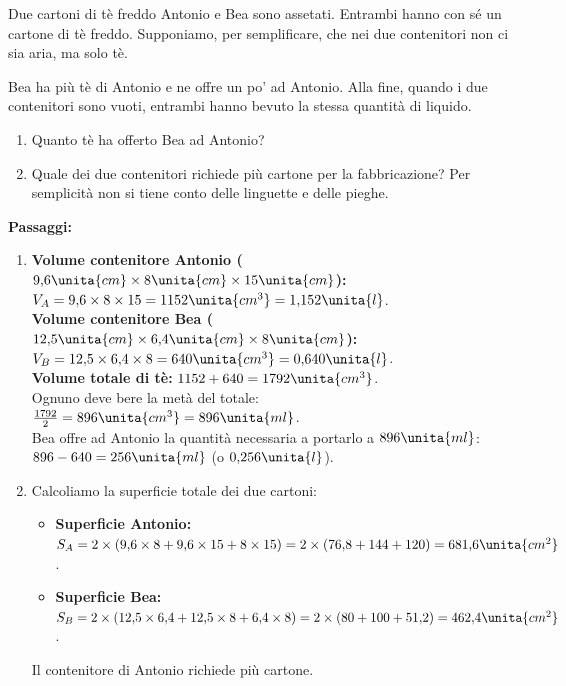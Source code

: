 \begin{esercizio}{Due cartoni di tè freddo}
Antonio e Bea sono assetati. Entrambi hanno con sé un cartone di tè freddo. Supponiamo, per semplificare, che nei due contenitori non ci sia aria, ma solo tè.

Bea ha più tè di Antonio e ne offre un po' ad Antonio. Alla fine, quando i due contenitori sono vuoti, entrambi hanno bevuto la stessa quantità di liquido.


\begin{enumerate}[label=\alph*)]
  \item Quanto tè ha offerto Bea ad Antonio?
  \item Quale dei due contenitori richiede più cartone per la fabbricazione? Per semplicità non si tiene conto delle linguette e delle pieghe.
\end{enumerate}

\responsespace{2.8cm}

\begin{soluzione}
  \textbf{Passaggi:}
  \begin{enumerate}[label=\alph*)]
    \item \textbf{Volume contenitore Antonio ($9{,}6\unita{cm} \times 8\unita{cm} \times 15\unita{cm}$):}\\
    $V_A = 9{,}6 \times 8 \times 15 = 1152\unita{cm^3} = 1{,}152\unita{l}$.\\
    \textbf{Volume contenitore Bea ($12{,}5\unita{cm} \times 6{,}4\unita{cm} \times 8\unita{cm}$):}\\
    $V_B = 12{,}5 \times 6{,}4 \times 8 = 640\unita{cm^3} = 0{,}640\unita{l}$.\\
    \textbf{Volume totale di tè:} $1152 + 640 = 1792\unita{cm^3}$.\\
    Ognuno deve bere la metà del totale: $\frac{1792}{2} = 896\unita{cm^3} = 896\unita{ml}$.\\
    Bea offre ad Antonio la quantità necessaria a portarlo a $896\unita{ml}$: $896 - 640 = 256\unita{ml}$ (o $0{,}256\unita{l}$).
    \item Calcoliamo la superficie totale dei due cartoni:
    \begin{itemize}
      \item \textbf{Superficie Antonio:} $S_A = 2 \times (9{,}6 \times 8 + 9{,}6 \times 15 + 8 \times 15) = 2 \times (76{,}8 + 144 + 120) = 681{,}6\unita{cm^2}$.
      \item \textbf{Superficie Bea:} $S_B = 2 \times (12{,}5 \times 6{,}4 + 12{,}5 \times 8 + 6{,}4 \times 8) = 2 \times (80 + 100 + 51{,}2) = 462{,}4\unita{cm^2}$.
    \end{itemize}
    Il contenitore di Antonio richiede più cartone.
  \end{enumerate}
\end{soluzione}
\end{esercizio}

